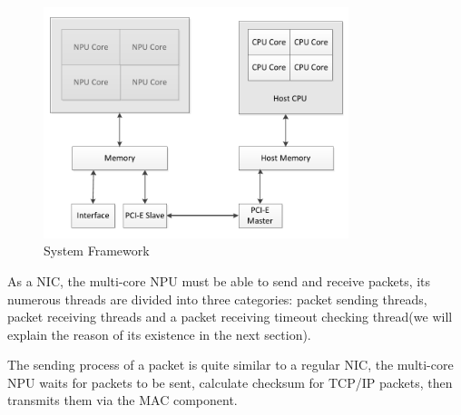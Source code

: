 \documentclass[conference]{IEEEtran}
\begin{document}
\begin{figure}[!t]
\centering
\includegraphics[width=3.5in]{system_framework}
\caption{System Framework}
\label{system framework}
\end{figure}

As a NIC, the multi-core NPU must be able to send and receive packets, its numerous threads are divided into three categories: packet sending threads, packet receiving threads and a packet receiving timeout checking thread(we will explain the reason of its existence in the next section).

The sending process of a packet is quite similar to a regular NIC, the multi-core NPU waits for packets to be sent, calculate checksum for TCP/IP packets, then transmits them via the MAC component.
\end{document}
